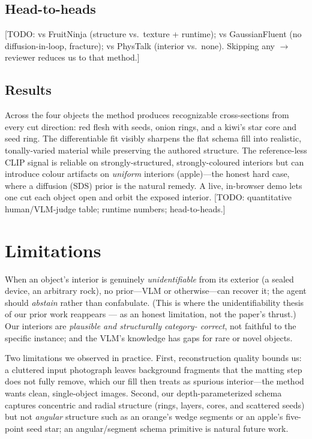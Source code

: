 \documentclass[10pt,twocolumn,letterpaper]{article}
\newcommand{\todo}[1]{{\color{red}\small[TODO: #1]}}
\newcommand{\note}[1]{{\color{teal}\small(#1)}}
\begin{document}
\subsection{Head-to-heads}
\todo{vs FruitNinja (structure vs.\ texture + runtime); vs
GaussianFluent (no diffusion-in-loop, fracture); vs PhysTalk (interior
vs.\ none). Skipping any $\rightarrow$ reviewer reduces us to that method.}

\subsection{Results}
Across the four objects the method produces recognizable cross-sections
from every cut direction: red flesh with seeds, onion rings, and a kiwi's
star core and seed ring. The differentiable fit visibly sharpens the flat
schema fill into realistic, tonally-varied material while preserving the
authored structure. The reference-less CLIP signal is reliable on
strongly-structured, strongly-coloured interiors but can introduce colour
artifacts on \emph{uniform} interiors (apple)---the honest hard case,
where a diffusion (SDS) prior is the natural remedy. A live, in-browser
demo lets one cut each object open and orbit the exposed interior.
\todo{quantitative human/VLM-judge table; runtime numbers; head-to-heads.}

\section{Limitations}
\label{sec:limits}
When an object's interior is genuinely \emph{unidentifiable} from its
exterior (a sealed device, an arbitrary rock), no prior---VLM or
otherwise---can recover it; the agent should \emph{abstain} rather than
confabulate. \note{This is where the unidentifiability thesis of our
prior work reappears --- as an honest limitation, not the paper's
thrust.} Our interiors are \emph{plausible and structurally category-
correct}, not faithful to the specific instance; and the VLM's knowledge
has gaps for rare or novel objects.

Two limitations we observed in practice. First, reconstruction quality
bounds us: a cluttered input photograph leaves background fragments that
the matting step does not fully remove, which our fill then treats as
spurious interior---the method wants clean, single-object images. Second,
our depth-parameterized schema captures concentric and radial structure
(rings, layers, cores, and scattered seeds) but not \emph{angular}
structure such as an orange's wedge segments or an apple's five-point
seed star; an angular/segment schema primitive is natural future work.
\end{document}

